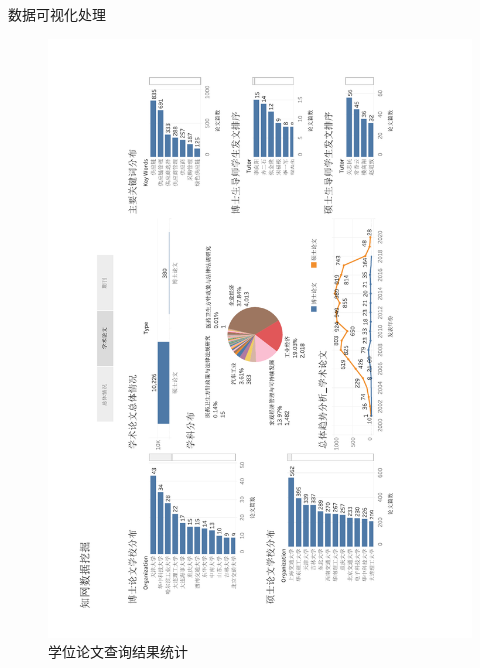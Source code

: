 \documentclass{beamer}
\begin{document}
\begin{frame}{数据可视化处理}
	\vspace{-7mm}
	\begin{figure}[h]
		\centering
		\includegraphics[height=1.4\textheight,trim=110 40 110 40,clip,angle=-90]{pic/data2.pdf}
		\caption{学位论文查询结果统计}
	\end{figure}
\end{frame}
\end{document}
